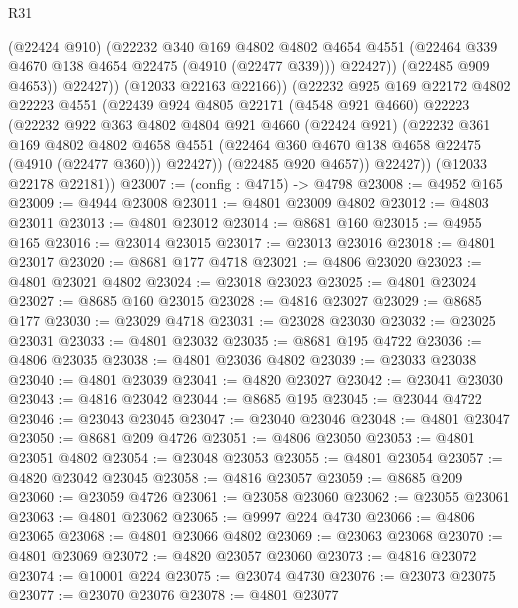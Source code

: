 \begin{lexlean}{R31}
\begin{coremodule}
                  (@22424 @910)
                  (@22232
                    @340
                    @169
                    @4802
                    @4802
                    @4654
                    @4551
                    (@22464 @339 @4670 @138 @4654 @22475 (@4910 (@22477 @339)))
                    @22427))
                (@22485 @909 @4653))
              @22427))
          (@12033 @22163 @22166))
        (@22232
          @925
          @169
          @22172
          @4802
          @22223
          @4551
          (@22439
            @924
            @4805
            @22171
            (@4548 @921 @4660)
            @22223
            (@22232
              @922
              @363
              @4802
              @4804
              @921
              @4660
              (@22424 @921)
              (@22232
                @361
                @169
                @4802
                @4802
                @4658
                @4551
                (@22464 @360 @4670 @138 @4658 @22475 (@4910 (@22477 @360)))
                @22427))
            (@22485 @920 @4657))
          @22427))
      (@12033 @22178 @22181))
@23007 := (config : @4715) -> @4798
@23008 := @4952 @165
@23009 := @4944 @23008
@23011 := @4801 @23009 @4802
@23012 := @4803 @23011
@23013 := @4801 @23012
@23014 := @8681 @160
@23015 := @4955 @165
@23016 := @23014 @23015
@23017 := @23013 @23016
@23018 := @4801 @23017
@23020 := @8681 @177 @4718
@23021 := @4806 @23020
@23023 := @4801 @23021 @4802
@23024 := @23018 @23023
@23025 := @4801 @23024
@23027 := @8685 @160 @23015
@23028 := @4816 @23027
@23029 := @8685 @177
@23030 := @23029 @4718
@23031 := @23028 @23030
@23032 := @23025 @23031
@23033 := @4801 @23032
@23035 := @8681 @195 @4722
@23036 := @4806 @23035
@23038 := @4801 @23036 @4802
@23039 := @23033 @23038
@23040 := @4801 @23039
@23041 := @4820 @23027
@23042 := @23041 @23030
@23043 := @4816 @23042
@23044 := @8685 @195
@23045 := @23044 @4722
@23046 := @23043 @23045
@23047 := @23040 @23046
@23048 := @4801 @23047
@23050 := @8681 @209 @4726
@23051 := @4806 @23050
@23053 := @4801 @23051 @4802
@23054 := @23048 @23053
@23055 := @4801 @23054
@23057 := @4820 @23042 @23045
@23058 := @4816 @23057
@23059 := @8685 @209
@23060 := @23059 @4726
@23061 := @23058 @23060
@23062 := @23055 @23061
@23063 := @4801 @23062
@23065 := @9997 @224 @4730
@23066 := @4806 @23065
@23068 := @4801 @23066 @4802
@23069 := @23063 @23068
@23070 := @4801 @23069
@23072 := @4820 @23057 @23060
@23073 := @4816 @23072
@23074 := @10001 @224
@23075 := @23074 @4730
@23076 := @23073 @23075
@23077 := @23070 @23076
@23078 := @4801 @23077

\end{coremodule}
\end{lexlean}
